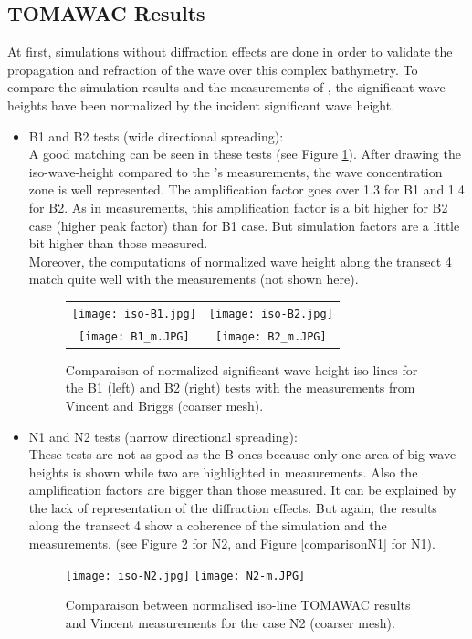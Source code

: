 \subsection{TOMAWAC Results }
At first, simulations without diffraction effects are done in order to validate the propagation and refraction of the wave over this complex bathymetry. To compare the simulation results and the measurements of \cite{Vincent1989}, the significant wave heights have been normalized by the incident significant wave height.\\
\begin{itemize}
\item B1 and B2 tests (wide directional spreading):\\
A good matching can be seen in these tests (see Figure \ref{comparisonVB}). After drawing the iso-wave-height compared to the \cite{Vincent1989}'s measurements, the wave concentration zone is well represented. The amplification factor goes over 1.3 for B1 and 1.4 for B2. As in measurements, this amplification factor is a bit higher for B2 case (higher peak factor) than for B1 case. But simulation factors are a little bit higher than those measured.\\
Moreover, the computations of normalized wave height along the transect 4 match quite well with the measurements (not shown here).\\
\begin{figure}[H]
  \centering
  \begin{tabular}{cc}
  	\texttt{[image: iso-B1.jpg]}&\texttt{[image: iso-B2.jpg]}\\
  	\texttt{[image: B1\_m.JPG]}
 	&
    \texttt{[image: B2\_m.JPG]}\\
     \end{tabular}
      \caption{Comparaison of normalized significant wave height iso-lines for the B1 (left) and B2 (right) tests with the measurements from Vincent and Briggs (coarser mesh).}
\label{comparisonVB}
\end{figure}

\item N1 and N2 tests (narrow directional spreading):\\
These tests are not as good as the B ones because only one area of big wave heights is shown while two are highlighted in measurements. Also the amplification factors are bigger than those measured. It can be explained by the lack of representation of the diffraction effects. But again, the results along the transect 4 show a coherence of the simulation and the measurements. (see Figure \ref{comparisonN2} for N2, and Figure \ref{comparisonN1} for N1).
\begin{figure}[H]
  \centering
    \texttt{[image: iso-N2.jpg]}
    \texttt{[image: N2-m.JPG]}
      \caption{Comparaison between normalised iso-line TOMAWAC results and Vincent measurements for the case N2 (coarser mesh). }
\label {comparisonN2}
\end{figure}
\end{itemize}
